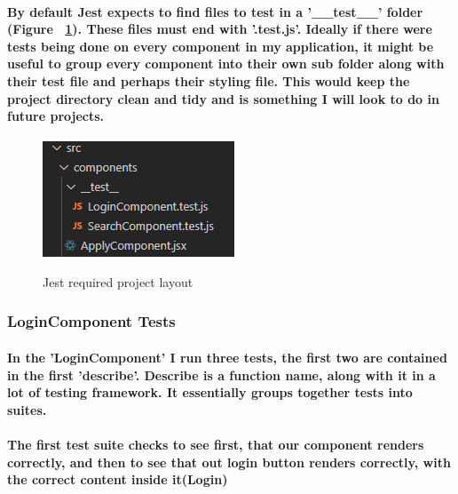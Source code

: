 \paragraph{By default \textbf{Jest} expects to find files to test in a '\_\_test\_\_' folder (Figure ~\ref{test4_label}). These files must end with '.test.js'. Ideally if there were tests being done on every component in my application, it might be useful to group every component into their own sub folder along with their test file and perhaps their styling file. This would keep the project directory clean and tidy and is something I will look to do in future projects.}
\begin{figure}[ht]
    \centering
    \includegraphics[scale=0.8]{Images/test4.png} 
    \label{test4_label}
    \caption{Jest required project layout}
\end{figure}

\subsubsection{LoginComponent Tests}
\paragraph{In the 'LoginComponent' I run three tests, the first two are contained in the first 'describe'. \textbf{Describe} is a function name, along with \textbf{it} in a lot of testing framework. It essentially groups together tests into suites.}

\paragraph{The first test suite checks to see first, that our component renders correctly, and then to see that out login button renders correctly, with the correct content inside it(Login)}
